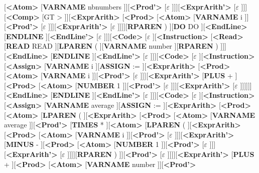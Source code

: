 \documentclass[border=5pt]{standalone}
\begin{document}
[{\textbf{\textless Atom\textgreater}} [{\textbf{VARNAME}  nbnumbers} ]][{\textbf{\textless Prod'\textgreater}} [{$\varepsilon$} ]]][{\textbf{\textless ExprArith'\textgreater}} [{$\varepsilon$} ]]][{\textbf{\textless Comp\textgreater}} [{GT \textgreater} ]][{\textbf{\textless ExprArith\textgreater}} [{\textbf{\textless Prod\textgreater}} [{\textbf{\textless Atom\textgreater}} [{\textbf{VARNAME}  i} ]][{\textbf{\textless Prod'\textgreater}} [{$\varepsilon$} ]]][{\textbf{\textless ExprArith'\textgreater}} [{$\varepsilon$} ]]]][{\textbf{RPAREN}  )} ][{\textbf{DO}  DO} ][{\textbf{\textless EndLine\textgreater}} [{\textbf{ENDLINE}  \n} ][{\textbf{\textless EndLine'\textgreater}} [{$\varepsilon$} ]]][{\textbf{\textless Code\textgreater}} [{$\varepsilon$} ][{\textbf{\textless Instruction\textgreater}} [{\textbf{\textless Read\textgreater}} [{\textbf{READ}  READ} ][{\textbf{LPAREN}  (} ][{\textbf{VARNAME}  number} ][{\textbf{RPAREN}  )} ]]][{\textbf{\textless EndLine\textgreater}} [{\textbf{ENDLINE}  \n} ][{\textbf{\textless EndLine'\textgreater}} [{$\varepsilon$} ]]][{\textbf{\textless Code\textgreater}} [{$\varepsilon$} ][{\textbf{\textless Instruction\textgreater}} [{\textbf{\textless Assign\textgreater}} [{\textbf{VARNAME}  i} ][{\textbf{ASSIGN}  :=} ][{\textbf{\textless ExprArith\textgreater}} [{\textbf{\textless Prod\textgreater}} [{\textbf{\textless Atom\textgreater}} [{\textbf{VARNAME}  i} ]][{\textbf{\textless Prod'\textgreater}} [{$\varepsilon$} ]]][{\textbf{\textless ExprArith'\textgreater}} [{\textbf{PLUS}  +} ][{\textbf{\textless Prod\textgreater}} [{\textbf{\textless Atom\textgreater}} [{\textbf{NUMBER}  1} ]][{\textbf{\textless Prod'\textgreater}} [{$\varepsilon$} ]]][{\textbf{\textless ExprArith'\textgreater}} [{$\varepsilon$} ]]]]]][{\textbf{\textless EndLine\textgreater}} [{\textbf{ENDLINE}  \n} ][{\textbf{\textless EndLine'\textgreater}} [{$\varepsilon$} ]]][{\textbf{\textless Code\textgreater}} [{$\varepsilon$} ][{\textbf{\textless Instruction\textgreater}} [{\textbf{\textless Assign\textgreater}} [{\textbf{VARNAME}  average} ][{\textbf{ASSIGN}  :=} ][{\textbf{\textless ExprArith\textgreater}} [{\textbf{\textless Prod\textgreater}} [{\textbf{\textless Atom\textgreater}} [{\textbf{LPAREN}  (} ][{\textbf{\textless ExprArith\textgreater}} [{\textbf{\textless Prod\textgreater}} [{\textbf{\textless Atom\textgreater}} [{\textbf{VARNAME}  average} ]][{\textbf{\textless Prod'\textgreater}} [{\textbf{TIMES}  *} ][{\textbf{\textless Atom\textgreater}} [{\textbf{LPAREN}  (} ][{\textbf{\textless ExprArith\textgreater}} [{\textbf{\textless Prod\textgreater}} [{\textbf{\textless Atom\textgreater}} [{\textbf{VARNAME}  i} ]][{\textbf{\textless Prod'\textgreater}} [{$\varepsilon$} ]]][{\textbf{\textless ExprArith'\textgreater}} [{\textbf{MINUS}  -} ][{\textbf{\textless Prod\textgreater}} [{\textbf{\textless Atom\textgreater}} [{\textbf{NUMBER}  1} ]][{\textbf{\textless Prod'\textgreater}} [{$\varepsilon$} ]]][{\textbf{\textless ExprArith'\textgreater}} [{$\varepsilon$} ]]]][{\textbf{RPAREN}  )} ]][{\textbf{\textless Prod'\textgreater}} [{$\varepsilon$} ]]]][{\textbf{\textless ExprArith'\textgreater}} [{\textbf{PLUS}  +} ][{\textbf{\textless Prod\textgreater}} [{\textbf{\textless Atom\textgreater}} [{\textbf{VARNAME}  number} ]][{\textbf{\textless Prod'\textgreater}} 
\end{document}
